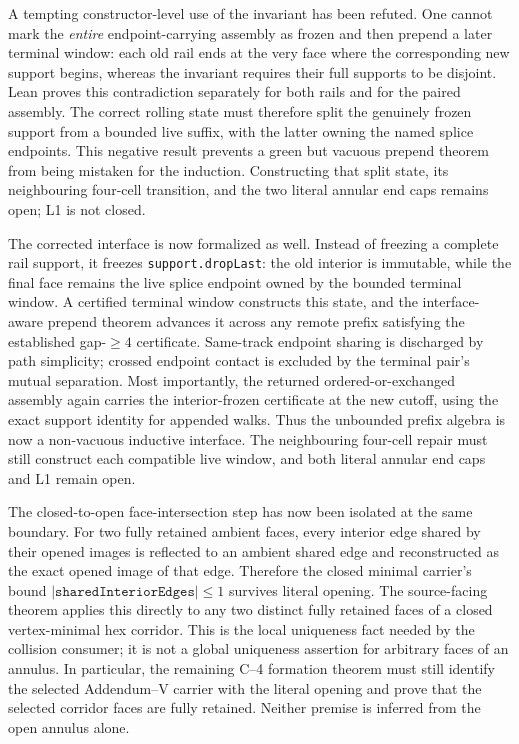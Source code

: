 \documentclass[11pt]{article}
\theoremstyle{definition}
\begin{document}
A tempting constructor-level use of the invariant has been refuted.  One
cannot mark the \emph{entire} endpoint-carrying assembly as frozen and then
prepend a later terminal window: each old rail ends at the very face where the
corresponding new support begins, whereas the invariant requires their full
supports to be disjoint.  Lean proves this contradiction separately for both
rails and for the paired assembly.  The correct rolling state must therefore
split the genuinely frozen support from a bounded live suffix, with the latter
owning the named splice endpoints.  This negative result prevents a green but
vacuous prepend theorem from being mistaken for the induction.  Constructing
that split state, its neighbouring four-cell transition, and the two literal
annular end caps remains open; L1 is not closed.

The corrected interface is now formalized as well.  Instead of freezing a
complete rail support, it freezes \texttt{support.dropLast}: the old interior
is immutable, while the final face remains the live splice endpoint owned by
the bounded terminal window.  A certified terminal window constructs this
state, and the interface-aware prepend theorem advances it across any remote
prefix satisfying the established gap-$\geq4$ certificate.  Same-track
endpoint sharing is discharged by path simplicity; crossed endpoint contact
is excluded by the terminal pair's mutual separation.  Most importantly, the
returned ordered-or-exchanged assembly again carries the interior-frozen
certificate at the new cutoff, using the exact support identity for appended
walks.  Thus the unbounded prefix algebra is now a non-vacuous inductive
interface.  The neighbouring four-cell repair must still construct each
compatible live window, and both literal annular end caps and L1 remain open.

The closed-to-open face-intersection step has now been isolated at the same
boundary.  For two fully retained ambient faces, every interior edge shared
by their opened images is reflected to an ambient shared edge and reconstructed
as the exact opened image of that edge.  Therefore the closed minimal
carrier's bound
\(\lvert\texttt{sharedInteriorEdges}\rvert\leq 1\) survives literal opening.
The source-facing theorem applies this directly to any two distinct fully
retained faces of a closed vertex-minimal hex corridor.  This is the local
uniqueness fact needed by the collision consumer; it is not a global
uniqueness assertion for arbitrary faces of an annulus.  In particular, the
remaining C--4 formation theorem must still identify the selected Addendum--V
carrier with the literal opening and prove that the selected corridor faces
are fully retained.  Neither premise is inferred from the open annulus alone.
\end{document}

